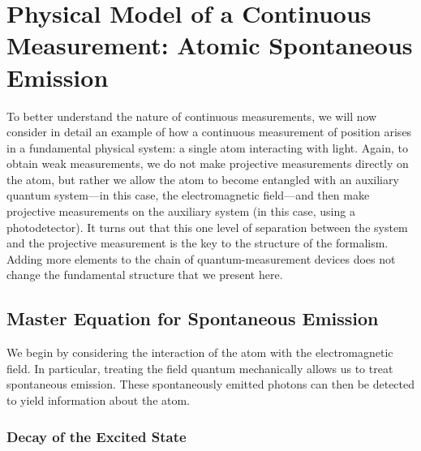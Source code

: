 \documentclass[12pt,aps,onecolum,superscriptaddress,footinbib,floatfix,showpacs]{revtex4-1}
\begin{document}
\section{Physical Model of a Continuous Measurement: Atomic Spontaneous
Emission}

To better understand the nature of continuous measurements, we will
now consider in detail an example of how a continuous measurement
of position
arises in a fundamental physical system: a single atom interacting
with light.
Again, to obtain weak measurements, we do not make projective measurements
directly on the atom, but rather we allow the atom to become entangled
with an auxiliary quantum system---in this case, the electromagnetic field---and
then make projective measurements on the auxiliary system (in this case,
using a photodetector).  It turns out that this one level of separation
between the system and the projective measurement is the key
to the structure of the formalism.  Adding more elements to the chain
of quantum-measurement devices does not change the fundamental structure that
we present here.
 

\subsection{Master Equation for Spontaneous Emission}

We begin by considering the interaction of the atom with the electromagnetic
field.  In particular, treating the field quantum mechanically allows
us to treat spontaneous emission.  These spontaneously emitted photons
can then be detected to yield information about the atom.

\subsubsection{Decay of the Excited State}
\end{document}
